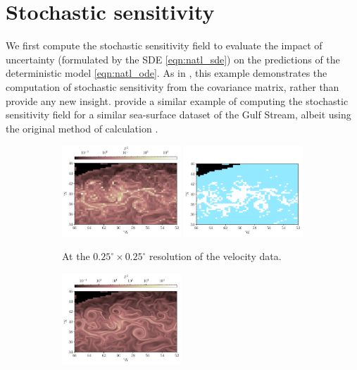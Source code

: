 \section{Stochastic sensitivity}
We first compute the stochastic sensitivity field to evaluate the impact of uncertainty (formulated by the SDE \cref{eqn:natl_sde}) on the predictions of the deterministic model \cref{eqn:natl_ode}.
As in , this example demonstrates the computation of stochastic sensitivity from the covariance matrix, rather than provide any new insight.
\citet{BadzaEtAl_2023_HowSensitiveAre} provide a similar example of computing the stochastic sensitivity field for a similar sea-surface dataset of the Gulf Stream, albeit using the original method of calculation \citep{Balasuriya_2020_StochasticSensitivityComputable}.

\begin{figure}
	\centering
	\begin{subfigure}{\textwidth}
		\includegraphics[width=0.49\textwidth]{chp06_applications/figures/gulf_stream/S2_field_grid}
		\includegraphics[width=0.49\textwidth]{chp06_applications/figures/gulf_stream/S2_robust_grid_2.0}
		\caption{At the \(0.25^\circ \times 0.25^\circ\) resolution of the velocity data.}
		\label{fig:na_s2_grid}
	\end{subfigure}
	\begin{subfigure}{\textwidth}
		\includegraphics[width=0.49\textwidth]{chp06_applications/figures/gulf_stream/S2_field_high}

\end{subfigure}
\end{figure}
